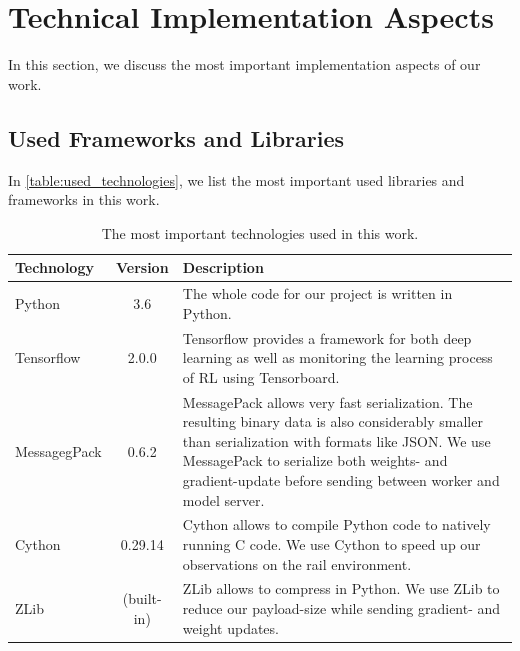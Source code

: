 \section{Technical Implementation Aspects}\label{software}
In this section, we discuss the most important implementation aspects of our work. 
\subsection*{Used Frameworks and Libraries}\label{framework_and_libraries}
In \autoref{table:used_technologies}, we list the most important used libraries and frameworks in this work.
\begin{table}[H]
	\centering
	\begin{tabularx}{\textwidth}{ |l|c|X| } 
		\hline
		\textbf{Technology}	& \textbf{Version} & \textbf{Description}\\
		\hline
		Python & 3.6 & The whole code for our project is written in Python.\\
		\hline
		Tensorflow & 2.0.0 & Tensorflow provides a framework for both deep learning as well as monitoring the learning process of RL using Tensorboard.\\
		\hline
		MessagegPack & 0.6.2 & MessagePack allows very fast serialization. The resulting binary data is also considerably smaller than serialization with formats like JSON. We use MessagePack to serialize both weights- and gradient-update before sending between worker and model server.\\
		\hline
		Cython & 0.29.14 & Cython allows to compile Python code to natively running C code. We use Cython to speed up our observations on the rail environment.\\
		\hline
		ZLib & (built-in) & ZLib allows to compress in Python. We use ZLib to reduce our payload-size while sending gradient- and weight updates.\\
		\hline
	\end{tabularx}
	\caption{The most important technologies used in this work.}
	\label{table:used_technologies}
\end{table}


